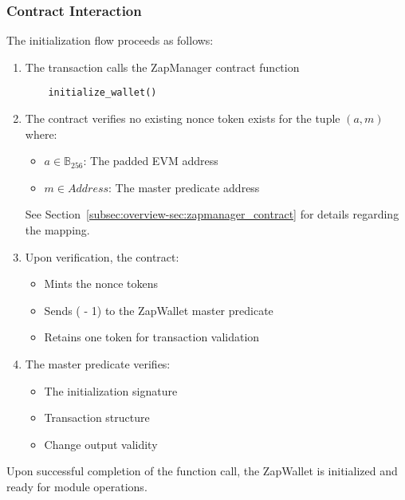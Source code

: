 \subsubsection{Contract Interaction}
The initialization flow proceeds as follows:
\begin{enumerate}
   \item The transaction calls the ZapManager contract function
    \begin{lstlisting}
    initialize_wallet()
    \end{lstlisting}

   \item The contract verifies no existing nonce token exists for the tuple $(a, m)$ where:
       \begin{itemize}
           \item $a \in \mathbb{B}_{256}$: The padded EVM address
           \item $m \in Address$: The master predicate address
       \end{itemize}
       See Section~\ref{subsec:overview-sec:zapmanager_contract} for details regarding the mapping.
   \item Upon verification, the contract:
       \begin{itemize}
           \item Mints the nonce tokens
           \item Sends ( - 1) to the ZapWallet master predicate
           \item Retains one token for transaction validation
       \end{itemize}
   \item The master predicate verifies:
       \begin{itemize}
           \item The initialization signature
           \item Transaction structure
           \item Change output validity
       \end{itemize}
\end{enumerate}




Upon successful completion of the  function call, the ZapWallet is initialized and ready for module operations.